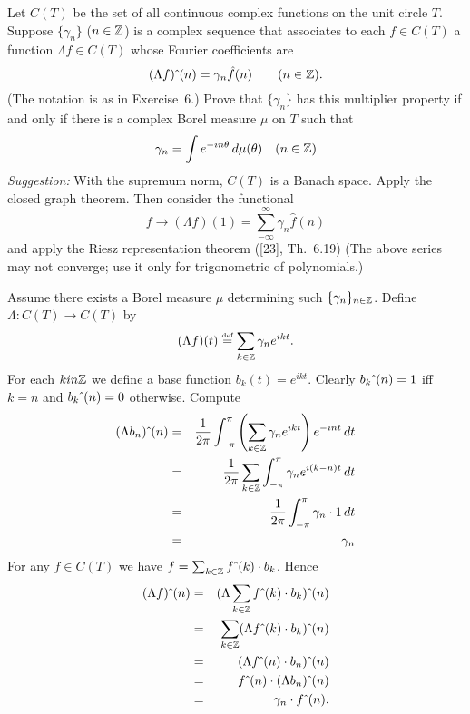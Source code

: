 \begin{enumerate}
\begin{excopy}
Let \(C(T)\) be the set of all continuous complex functions
on the unit circle $T$.
Suppose \(\{\gamma_n\}\) (\(n\in\mathbb{Z}\)) is a complex sequence that associates
to each \(f\in C(T)\) a function \(\Lambda f \in C(T)\) whose 
Fourier coefficients  are
\begin{equation*}
 (\Lambda f){\,\hat{}\,}(n) = \gamma_n\hat{f}(n) \qquad (n\in\mathbb{Z}).
\end{equation*}
(The notation is as in Exercise~6.) Prove that \(\{\gamma_n\}\)
has this multiplier property if and only if there is a complex Borel measure
\(\mu\) on $T$ such that 
\begin{equation*}
 \gamma_n = \int e^{-in\theta}\,d\mu(\theta) \quad (n\in\mathbb{Z})
\end{equation*}
\emph{Suggestion:} With the supremum norm, \(C(T)\) is a Banach space.
Apply the closed graph theorem. Then consider the functional
\begin{equation*}
 f \to (\Lambda f)(1) = \sum_{-\infty}^{\infty} \gamma_n \hat{f}(n)
\end{equation*}
and apply the Riesz representation theorem ([23], Th.~6.19)
(The above series may not converge;
use it only for trigonometric of polynomials.)
\end{excopy}

Assume there exists a Borel measure \(\mu\)
determining such \(\{\gamma_n\}_{n\in\mathbb{Z}}\).
Define \(\Lambda : C(T) \to C(T)\) by
\begin{equation*}
(\Lambda f)(t) \stackrel{\mbox{\upshape\tiny def}}{=} \sum_{k\in\mathbb{Z}} \gamma_n e^{ikt}.
\end{equation*}
For each \(k in\mathbb{Z}\) we define a base function \(b_k(t) = e^{ikt}\).
Clearly \(b_k{\,\hat{}\,}(n) = 1\) iff \(k=n\) and 
\(b_k{\,\hat{}\,}(n) = 0\) otherwise.
Compute
\begin{eqnarray*}
\posthat{(\Lambda b_n)}(n) 
&=& \frac{1}{2\pi} \int_{-\pi}^\pi%
       \left(\sum_{k\in\Z} \gamma_n e^{ikt}\right) e^{-int}\,dt \\
&=& \frac{1}{2\pi} \sum_{k\in\Z} \int_{-\pi}^\pi \gamma_n e^{i(k-n)t}\,dt \\
&=& \frac{1}{2\pi} \int_{-\pi}^\pi \gamma_n \cdot 1\,dt \\
&=& \gamma_n
\end{eqnarray*}
For any \(f\in C(T)\) we have
\(f = \sum_{k\in\mathbb{Z}} f{\,\hat{}\,}(k)\cdot b_k\).
Hence
\begin{eqnarray*}
(\Lambda f){\,\hat{}\,}(n)
&=& (\Lambda \sum_{k\in\mathbb{Z}} f{\,\hat{}\,}(k)\cdot b_k ){\,\hat{}\,}(n) \\
&=& \sum_{k\in\mathbb{Z}} (\Lambda f{\,\hat{}\,}(k)\cdot b_k ){\,\hat{}\,}(n) \\
&=& (\Lambda f{\,\hat{}\,}(n)\cdot b_n){\,\hat{}\,}(n) \\
&=& f{\,\hat{}\,}(n)\cdot (\Lambda b_n){\,\hat{}\,}(n) \\
&=& \gamma_n \cdot f{\,\hat{}\,}(n).
\end{eqnarray*}


\end{enumerate}
